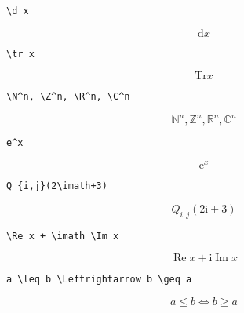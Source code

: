 \documentclass[a4paper,12pt]{article}
\renewcommand{\d}{\mathrm{d}}
\newcommand{\tr}{\mathrm{Tr}}
\newcommand{\e}{\mathrm{e}}
\renewcommand{\imath}{\mathrm{i}}
\newcommand{\N}{\mathbb{N}}
\newcommand{\Z}{\mathbb{Z}}
\newcommand{\R}{\mathbb{R}}
\renewcommand{\C}{\mathbb{C}}
\renewcommand{\leq}{\leqslant}
\renewcommand{\geq}{\geqslant}
\renewcommand{\Re}{\mathop{\mathrm{Re}}\nolimits}
\renewcommand{\Im}{\mathop{\mathrm{Im}}\nolimits}
\begin{document}
\begin{verbatim}
\d x
\end{verbatim}
$$\d x$$

\begin{verbatim}
\tr x
\end{verbatim}
$$\tr x$$

\begin{verbatim}
\N^n, \Z^n, \R^n, \C^n 
\end{verbatim}
$$\N^n, \Z^n, \R^n, \C^n $$

\begin{verbatim}
e^x
\end{verbatim}
$$\e^x$$

\begin{verbatim}
Q_{i,j}(2\imath+3)
\end{verbatim}
$$Q_{i,j}(2\imath+3)$$

\begin{verbatim}
\Re x + \imath \Im x
\end{verbatim}
$$\Re x + \imath \Im x$$

\begin{verbatim}
a \leq b \Leftrightarrow b \geq a
\end{verbatim}
$$a \leq b \Leftrightarrow b \geq a$$
\end{document}
